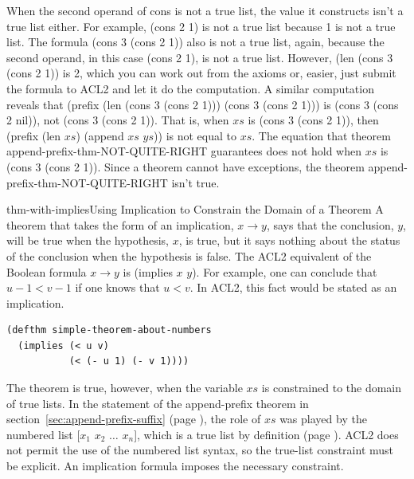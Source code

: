 When the second operand of \textsf{cons} is not a true list,
the value it constructs isn't a true list either.
For example, \textsf{(cons 2 1)} is not a true list because 1 is not a true list.
The formula \textsf{(cons 3 (cons 2 1))} also is not a true list,
again, because the second operand,
in this case \textsf{(cons 2 1)}, is not a true list.
However, \textsf{(len (cons 3 (cons 2 1))} is \textsf{2}, which you can work
out from the axioms or, easier,
just submit the formula to ACL2 and let it do the computation.
A similar computation reveals that
\textsf{(prefix (len (cons 3 (cons 2 1))) (cons 3 (cons 2 1)))}
is \textsf{(cons 3 (cons 2 nil))}, not \textsf{(cons 3 (cons 2 1))}.
That is, when $xs$ is \textsf{(cons 3 (cons 2 1))},
then \textsf{(prefix (len $xs$) (append $xs$ $ys$))} is not equal to $xs$.
The equation that theorem append-prefix-thm-NOT-QUITE-RIGHT
guarantees does not hold when $xs$ is \textsf{(cons 3 (cons 2 1))}.
Since a theorem cannot have exceptions,
the theorem append-prefix-thm-NOT-QUITE-RIGHT
isn't true.

\begin{aside}{thm-with-implies}{Using Implication to Constrain the Domain of a Theorem}
A theorem that takes the form of an implication, $x \rightarrow y$,
says that the conclusion, $y$, will be true when the hypothesis, $x$,
is true, but it says nothing about the status of the conclusion when
the hypothesis is false. The ACL2 equivalent of the Boolean formula $x \rightarrow y$
is \textsf{(implies $x$ $y$)}.
For example, one can conclude that $u - 1 < v - 1$
if one knows that $u < v$.
In ACL2, this fact would be stated as an implication.
\begin{code}
\begin{verbatim}
(defthm simple-theorem-about-numbers
  (implies (< u v)
           (< (- u 1) (- v 1))))
\end{verbatim}
\end{code}
\end{aside}

The theorem is true, however, when the variable $xs$ is
constrained to the domain of true lists.
In the statement of the append-prefix theorem in
section~\ref{sec:append-prefix-suffix} (page \pageref{app-pfx-thm-paper-and-pencil}),
the role of $xs$ was played by the numbered list
\textsf{[$x_1$ $x_2$ $\dots$ $x_n$]},
which is a true list by definition
(page \pageref{numbered-list-interpretation}).
ACL2 does not permit the use of the numbered list syntax,
so the true-list constraint must be explicit.
An implication formula imposes the necessary constraint.

